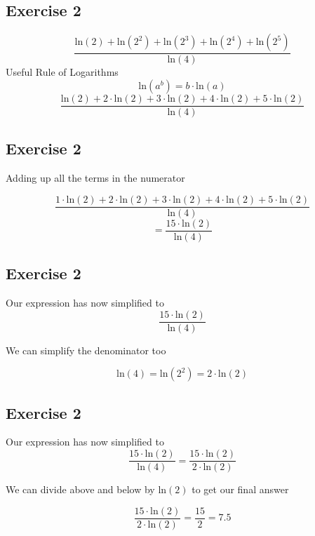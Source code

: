 \documentclass[]{report}
\begin{document}
\subsection{Exercise 2}


\[  \frac{\mbox{ln}(2) + \mbox{ln}(2^2) + \mbox{ln}(2^3)  + \mbox{ln}(2^4) + \mbox{ln}(2^5)  }  {\mbox{ln}(4)}  \]
Useful Rule of Logarithms
\[  \mbox{ln}(a^b)  = b\cdot \mbox{ln}(a)  \]
\[  \frac{\mbox{ln}(2) + 2 \cdot \mbox{ln}(2) + 3 \cdot\mbox{ln}(2)  + 4 \cdot \mbox{ln}(2) + 5 \cdot \mbox{ln}(2)  }  {\mbox{ln}(4)}  \]
\subsection{Exercise 2}

Adding up all the terms in the numerator

\[  \frac{1\cdot\mbox{ln}(2) + 2 \cdot \mbox{ln}(2) + 3 \cdot\mbox{ln}(2)  + 4 \cdot \mbox{ln}(2) + 5 \cdot \mbox{ln}(2)  }  {\mbox{ln}(4)} \]  \[= \frac{15 \cdot \mbox{ln}(2) }{\mbox{ln}(4)} \]



\subsection{Exercise 2}

Our expression has now simplified to 
\[\frac{15 \cdot \mbox{ln}(2) }{\mbox{ln}(4)} \]

We can simplify the denominator too

\[ \mbox{ln}(4) =  \mbox{ln}(2^2) = 2 \cdot \mbox{ln}(2) \]



\subsection{Exercise 2}

Our expression has now simplified to 
\[\frac{15 \cdot \mbox{ln}(2) }{\mbox{ln}(4)} = \frac{15 \cdot \mbox{ln}(2) }{2 \cdot \mbox{ln}(2)} \]

We can divide above and below by $\mbox{ln}(2)$ to get our final answer


\[ \frac{15 \cdot \mbox{ln}(2) }{2 \cdot \mbox{ln}(2)} = \frac{15}{2} = 7.5 \]
\end{document}
